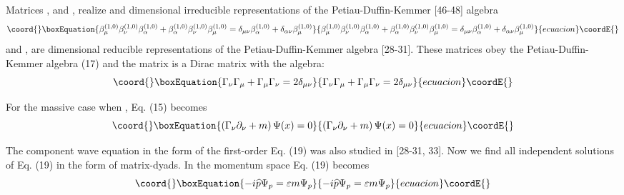 \documentclass[a4paper,12pt]{article}
\begin{document}
Matrices \coordHE{}, \coordHE{} and
\coordHE{}, \coordHE{} realize \coordHE{}
and \coordHE{} dimensional irreducible representations of the
Petiau-Duffin-Kemmer [46-48] algebra
\begin{equation}\coord{}\boxEquation{
\beta _\mu ^{(1,0)}\beta _\nu ^{(1,0)}\beta _\alpha ^{(1,0)}+\beta _\alpha
^{(1,0)}\beta _\nu ^{(1,0)}\beta _\mu ^{(1,0)}=\delta _{\mu \nu }\beta
_\alpha ^{(1,0)}+\delta _{\alpha \nu }\beta _\mu ^{(1,0)}  \label{17}
}{
\beta _\mu ^{(1,0)}\beta _\nu ^{(1,0)}\beta _\alpha ^{(1,0)}+\beta _\alpha
^{(1,0)}\beta _\nu ^{(1,0)}\beta _\mu ^{(1,0)}=\delta _{\mu \nu }\beta
_\alpha ^{(1,0)}+\delta _{\alpha \nu }\beta _\mu ^{(1,0)}  }{ecuacion}\coordE{}\end{equation}
and \myHighlight{$\beta _\nu ^{(+)}$}\coordHE{}, \myHighlight{$\beta _\nu ^{(-)}$}\coordHE{} are \coordHE{}dimensional reducible
representations of the Petiau-Duffin-Kemmer algebra [28-31]. These matrices
obey the Petiau-Duffin-Kemmer algebra (17) and the matrix \myHighlight{$\Gamma _\nu $}\coordHE{} is
a \coordHE{}Dirac matrix with the algebra:
\begin{equation}\coord{}\boxEquation{
\Gamma _\nu \Gamma _\mu +\Gamma _\mu \Gamma _\nu =2\delta _{\mu
\nu } \label{18}
}{
\Gamma _\nu \Gamma _\mu +\Gamma _\mu \Gamma _\nu =2\delta _{\mu
\nu } }{ecuacion}\coordE{}\end{equation}

For the massive case when \coordHE{}, Eq. (15) becomes
\begin{equation}\coord{}\boxEquation{
\left( \Gamma _\nu \partial _\nu +m\right) \Psi (x)=0  \label{19}
}{
\left( \Gamma _\nu \partial _\nu +m\right) \Psi (x)=0  }{ecuacion}\coordE{}\end{equation}

The \coordHE{}component wave equation in the form of the first-order Eq. (19) was
also studied in [28-31, 33]. Now we find all independent solutions of Eq.
(19) in the form of matrix-dyads. In the momentum space Eq. (19) becomes
\begin{equation}\coord{}\boxEquation{
-i\widehat{p}\Psi _p=\varepsilon m\Psi _p  \label{20}
}{
-i\widehat{p}\Psi _p=\varepsilon m\Psi _p  }{ecuacion}\coordE{}\end{equation}
\end{document}
